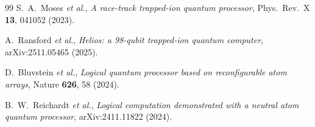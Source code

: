 \documentclass[
  aps,            %
  prc,            %
  reprint,        %
  superscriptaddress,
  floatfix,
  nofootinbib
]{revtex4-2}
\begin{document}
\begin{thebibliography}{99}
S.~A.~Moses \textit{et al.},
\textit{A race-track trapped-ion quantum processor},
Phys.\ Rev.\ X \textbf{13}, 041052 (2023).

A.~Ransford \textit{et al.},
\textit{Helios: a 98-qubit trapped-ion quantum computer},
arXiv:2511.05465 (2025).

D.~Bluvstein \textit{et al.},
\textit{Logical quantum processor based on reconfigurable atom arrays},
Nature \textbf{626}, 58 (2024).

B.~W.~Reichardt \textit{et al.},
\textit{Logical computation demonstrated with a neutral atom quantum processor},
arXiv:2411.11822 (2024).
\end{thebibliography}
\end{document}
